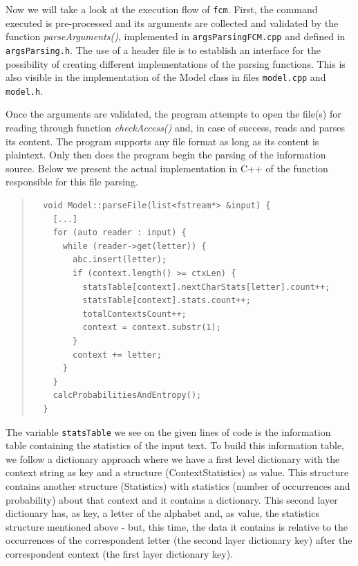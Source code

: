 \documentclass[12pt]{article}
\begin{document}
Now we will take a look at the execution flow of \texttt{fcm}.
First, the command executed is pre-processed and its arguments are collected
and validated by the function {\it parseArguments()\/}, implemented in 
\texttt{argsParsingFCM.cpp} and defined in \texttt{argsParsing.h}.
The use of a header file is to establish an interface for the possibility of
creating different implementations of the parsing functions.
This is also visible in the implementation of the Model class in files 
\texttt{model.cpp} and \texttt{model.h}.

Once the arguments are validated, the program attempts to open the file(s) for 
reading through function {\it checkAccess()\/} and, in case of success, reads 
and parses its content.
The program supports any file format as long as its content is plaintext.
Only then does the program begin the parsing of the information source.
Below we present the actual implementation in C++ of the function responsible 
for this file parsing.

\begingroup
\addtolength\leftmargini{-0.4in}
\addtolength\baselineskip{-0.05in}
\begin{quote}
\begin{verbatim}
  void Model::parseFile(list<fstream*> &input) {
    [...]
    for (auto reader : input) {
      while (reader->get(letter)) {
        abc.insert(letter);
        if (context.length() >= ctxLen) {
          statsTable[context].nextCharStats[letter].count++;
          statsTable[context].stats.count++;
          totalContextsCount++;
          context = context.substr(1);
        }
        context += letter;
      }
    }
    calcProbabilitiesAndEntropy();
  }
\end{verbatim}
\end{quote}
\endgroup

The variable \texttt{statsTable} we see on the given lines of code is the 
information table containing the statistics of the input text.
To build this information table, we follow a dictionary approach where we have
a first level dictionary with the context string as key and a structure 
(ContextStatistics) as value.
This structure contains another structure (Statistics) with statistics
(number of occurrences and probability) about that context and it contains
a dictionary.
This second layer dictionary has, as key, a letter of the alphabet and, as value,
the statistics structure mentioned above - but, this time, the data it contains
is relative to the occurrences of the correspondent letter (the second layer
dictionary key) after the correspondent context (the first layer dictionary key).
\end{document}
